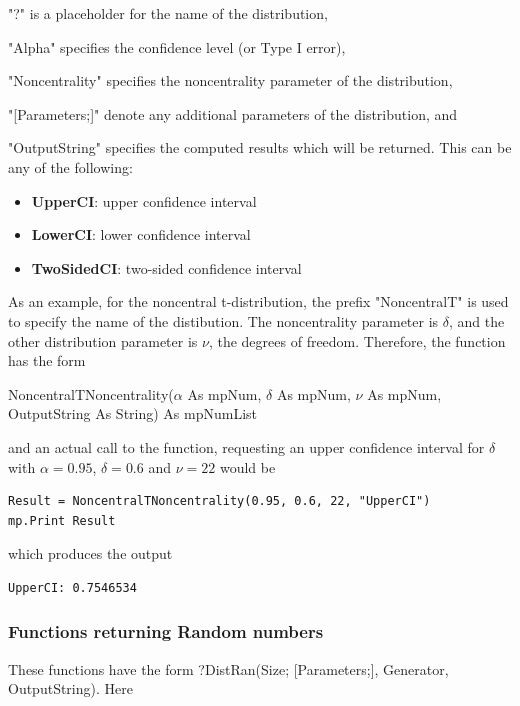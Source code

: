"?" is a placeholder for the name of the distribution, 

"Alpha" specifies the confidence level (or Type I error), 

"Noncentrality" specifies the noncentrality parameter of the distribution, 

"[Parameters;]" denote any additional parameters of the distribution, and 

"OutputString" specifies the computed results which will be returned. This can be any of the following:

\begin{itemize}
	\item \textbf{UpperCI}: upper confidence interval
	\item \textbf{LowerCI}: lower confidence interval
	\item \textbf{TwoSidedCI}: two-sided confidence interval
\end{itemize}


\vspace{0.3cm}
As an example, for the noncentral  t-distribution, the prefix "NoncentralT" is used to specify the name of the distibution. The noncentrality parameter is $\delta$, and the other distribution parameter is $\nu$, the degrees of freedom.  Therefore, the function has the form

\vspace{0.3cm}
\textsf{NoncentralTNoncentrality($\alpha$ As mpNum, $\delta$ As mpNum, $\nu$ As mpNum, OutputString As String) As mpNumList}

\vspace{0.3cm}
and an actual call to the function, requesting an upper confidence interval for $\delta$ with $\alpha = 0.95$, $\delta = 0.6$ and $\nu=22$   would be

\begin{lstlisting}
Result = NoncentralTNoncentrality(0.95, 0.6, 22, "UpperCI")
mp.Print Result
\end{lstlisting}
which produces the output

\begin{verbatim}
UpperCI: 0.7546534
\end{verbatim}



\newpage
\subsubsection{Functions returning Random numbers}
\label{Functions returning Random numbers}
These functions have the form \textsf{?DistRan(Size; [Parameters;], Generator, OutputString)}.
Here 

